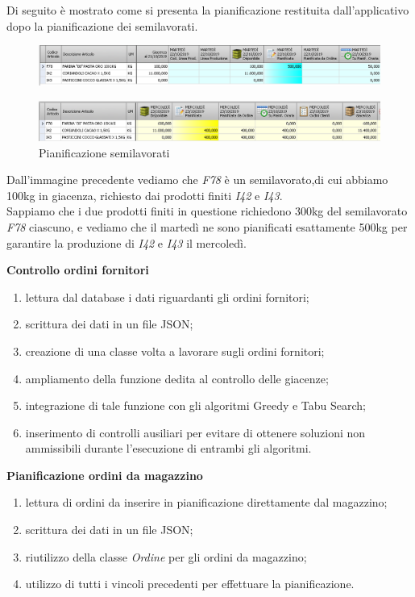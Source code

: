 Di seguito è mostrato come si presenta la pianificazione restituita dall'applicativo dopo la pianificazione dei semilavorati.

\begin{figure}[H]
	\includegraphics[width=\textwidth]{immagini/sl_planning.png}
	\centering
\end{figure}
\begin{figure}[H]
	\includegraphics[width=\textwidth]{immagini/sl_planning2.png}
    \centering
    \caption{Pianificazione semilavorati}
\end{figure}

Dall'immagine precedente vediamo che \textit{F78} è un semilavorato,di cui abbiamo 100kg in giacenza, richiesto dai prodotti finiti \textit{I42} e \textit{I43}.\\
Sappiamo che i due prodotti finiti in questione richiedono 300kg del semilavorato \textit{F78} ciascuno, e vediamo che il martedì ne sono pianificati esattamente 500kg
per garantire la produzione di \textit{I42} e \textit{I43} il mercoledì.

\newpage

\textbf{Controllo ordini fornitori} 
\begin{enumerate}
        \item lettura dal database i dati riguardanti gli ordini fornitori; 
        \item scrittura dei dati in un file JSON;
        \item creazione di una classe volta a lavorare sugli ordini fornitori;
        \item ampliamento della funzione dedita al controllo delle giacenze;
        \item integrazione di tale funzione con gli algoritmi Greedy e Tabu Search;
        \item inserimento di controlli ausiliari per evitare di ottenere soluzioni non ammissibili durante l'esecuzione di entrambi gli algoritmi.\\
\end{enumerate}

\textbf{Pianificazione ordini da magazzino} 
\begin{enumerate}
        \item lettura di ordini da inserire in pianificazione direttamente dal magazzino;
        \item scrittura dei dati in un file JSON;
        \item riutilizzo della classe \textit{Ordine} per gli ordini da magazzino;
        \item utilizzo di tutti i vincoli precedenti per effettuare la pianificazione.\\
\end{enumerate}

